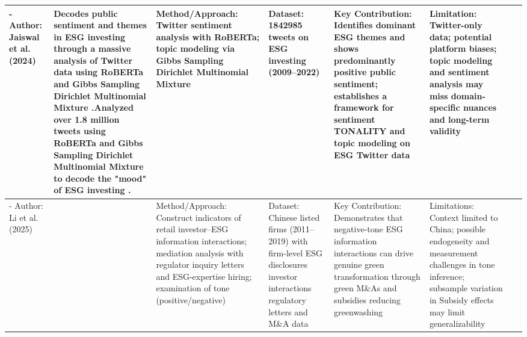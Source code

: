 \documentclass{article}
\begin{document}
\begin{landscape}
\begin{longtable}{p{1.8cm}
p{2.6cm}
p{3.4cm}
p{2.6cm}
p{3.5cm}
p{3.5cm}
p{0.8cm}}
- Author: Jaiswal et al. (2024) & Decodes public sentiment and themes in ESG investing through a massive analysis of Twitter data using RoBERTa and Gibbs Sampling Dirichlet Multinomial Mixture  \parencite{rachana_jaiswal_8eee1b17}.Analyzed over \textbf{1.8 million tweets} using RoBERTa and Gibbs Sampling Dirichlet Multinomial Mixture to decode the "mood" of ESG investing  \parencite{rachana_jaiswal_8eee1b17}. & Method/Approach: Twitter sentiment analysis with RoBERTa; topic modeling via Gibbs Sampling Dirichlet Multinomial Mixture & Dataset: 1842985 tweets on ESG investing (2009–2022) & Key Contribution: Identifies dominant ESG themes and shows predominantly positive public sentiment; establishes a framework for sentiment TONALITY and topic modeling on ESG Twitter data & Limitation: Twitter-only data; potential platform biases; topic modeling and sentiment analysis may miss domain-specific nuances and long-term validity & ~ \\ \hline
- Author: Li et al. (2025) & ~ & Method/Approach: Construct indicators of retail investor–ESG information interactions; mediation analysis with regulator inquiry letters and ESG-expertise hiring; examination of tone (positive/negative) & Dataset: Chinese listed firms (2011–2019) with firm-level ESG disclosures investor interactions regulatory letters and M\&A data & Key Contribution: Demonstrates that negative-tone ESG information interactions can drive genuine green transformation through green M\&As and subsidies reducing greenwashing & Limitations: Context limited to China; possible endogeneity and measurement challenges in tone inference; subsample variation in Subsidy effects may limit generalizability & ~ \\ \hline
\end{longtable}
\end{landscape}
\end{document}
